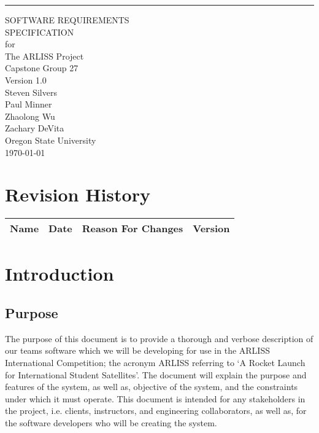 \documentclass{scrreprt}
\date{}
\def\myversion{1.0 }
\begin{document}
\begin{flushright}
    \rule{16cm}{5pt}\vskip1cm
    \begin{bfseries}
        \Huge{SOFTWARE REQUIREMENTS\\ SPECIFICATION}\\
        \vspace{1.9cm}
        for\\
        \vspace{1.9cm}
        The ARLISS Project\\
        \vspace{1.5cm}
        \LARGE{Capstone Group 27}\\
        
        \LARGE{Version \myversion}\\
        \vspace{1.7cm}
        	Steven Silvers\\
	Paul Minner\\
        	Zhaolong Wu\\
	Zachary DeVita\\
        \vspace{1.5cm}
        Oregon State University\\
        
        \today\\
	\vspace{1.9cm}
    \end{bfseries}
\end{flushright}

\tableofcontents
{}

\chapter*{Revision History}

\begin{center}
    \begin{tabular}{|c|c|c|c|}
        \hline
	    Name & Date & Reason For Changes & Version\\
        \hline
    \end{tabular}
\end{center}

\chapter{Introduction}

\section{Purpose}
The purpose of this document is to provide a thorough and verbose description of our teams software which we will be developing for use in the ARLISS International Competition; the acronym ARLISS referring to ‘A Rocket Launch for International Student Satellites’. The document will explain the purpose and features of the system, as well as, objective of the system, and the constraints under which it must operate. This document is intended for any stakeholders in the project, i.e. clients, instructors, and engineering collaborators, as well as, for the software developers who will be creating the system.
\end{document}
